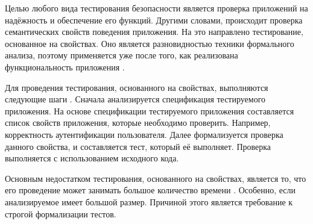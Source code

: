 %
Целью любого вида тестирования безопасности является проверка приложений на надёжность 
и обеспечение его функций. 
%
Другими словами, происходит проверка семантических свойств поведения приложения. 
%
На это направлено тестирование, основанное на свойствах. 
%
Оно является разновидностью техники формального анализа, поэтому применяется уже после того, 
как реализована функциональность приложения .

%
Для проведения тестирования, основанного на свойствах, выполняются следующие шаги 
. 
%
Сначала анализируется спецификация тестируемого приложения. 
%
На основе спецификации тестируемого приложения составляется список свойств приложения, которые 
необходимо проверить. 
%
Например, корректность аутентификации пользователя. 
%
Далее формализуется проверка данного свойства, и составляется тест, который её выполняет. 
%
Проверка выполняется с использованием исходного кода.

%
Основным недостатком тестирования, основанного на свойствах, является то, что его проведение может 
занимать большое количество времени . 
%
Особенно, если анализируемое  имеет большой размер. 
%
Причиной этого является требование к строгой формализации тестов.